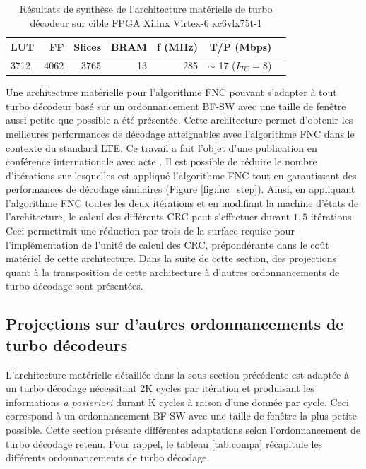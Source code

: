 \begin{table}[!b]
	\centering
	\caption{Résultats de synthèse de l'architecture matérielle de turbo décodeur %
	sur cible FPGA 
	Xilinx Virtex-6 xc6vlx75t-1}
	\label{tab:fnc_ip_xilinx}
	\begin{tabular}{lrrrrrr} 
		\toprule
		LUT & FF & Slices & BRAM & f (MHz)& T/P (Mbps) \\ 
		\midrule
		3712 & 4062 & 3765 & 13 & 285 & $\sim$ 17 ($I_{TC} = 8$)\\ 
		\bottomrule 
	\end{tabular}
\end{table}

Une architecture matérielle pour l'algorithme FNC pouvant s'adapter à tout turbo décodeur basé sur un
ordonnancement BF-SW avec une taille de fenêtre aussi petite que possible a été présentée. Cette architecture permet d'obtenir 
les meilleures performances de décodage atteignables avec l'algorithme FNC dans le contexte du standard LTE. Ce travail 
a fait l'objet d'une publication en
conférence internationale avec acte . Il est possible de réduire le nombre d'itérations sur lesquelles 
est appliqué l’algorithme FNC tout en garantissant des performances de décodage similaires (Figure \ref{fig:fnc_step}).
Ainsi, en appliquant l'algorithme FNC toutes les deux itérations et en modifiant la machine d'états de l'architecture, 
le calcul des différents CRC peut s'effectuer durant $1,5$ itérations. Ceci permettrait une réduction  par 
trois de la surface 
requise pour l'implémentation de l'unité de calcul des CRC, prépondérante dans le coût matériel de cette architecture. 
Dans la suite de cette section, des
projections quant à la transposition de cette architecture à d'autres ordonnancements de turbo décodage sont présentées.

\subsection{Projections sur d'autres ordonnancements de turbo décodeurs}
L'architecture matérielle détaillée dans la sous-section précédente est adaptée à un turbo décodage nécessitant 2K 
cycles par itération et produisant les informations \textit{a posteriori} durant K cycles à raison d'une donnée par 
cycle. Ceci correspond à un ordonnancement BF-SW avec une taille de fenêtre la plus petite possible. Cette section présente 
différentes adaptations selon l'ordonnancement de turbo décodage retenu. Pour rappel, le tableau \ref{tab:compa} récapitule
les différents ordonnancements de turbo décodage.

